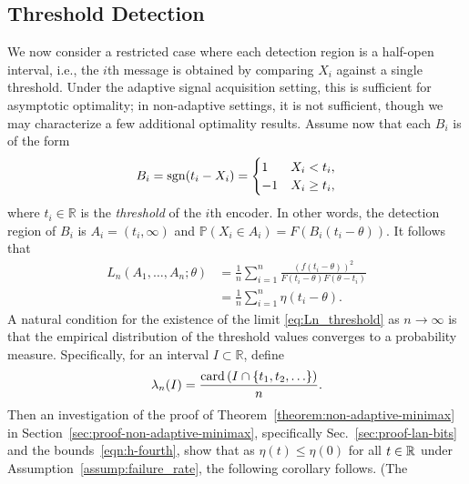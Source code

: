 \subsection{Threshold Detection}
\label{subsec:threshold}

We now consider a restricted case where each detection region is a
half-open interval, i.e., the $i$th message is obtained by comparing $X_i$
against a single threshold. Under the adaptive signal acquisition setting,
this is sufficient for asymptotic optimality;
in non-adaptive settings, it is not sufficient, though we may characterize
a few additional optimality results.
Assume now that each $B_i$ is of the form
\begin{equation}
  \label{eq:threshold_message}
  B_i = \mathrm{sgn}(t_i - X_i) = \begin{cases} 1 & X_i<  t_i, \\
    -1 & X_i \geq t_i,
  \end{cases}  
\end{equation}
where $t_i\in\mathbb R$ is the \emph{threshold} of the $i$th encoder. In
other words, the detection region of $B_i$ is $A_i = (t_i,\infty)$ and
$\mathbb P(X_i \in A_i) = F \left( B_i(t_i-\theta) \right)$. It follows that
\begin{align}
  L_n(A_1,\ldots,A_n;\theta)
  & = \frac{1}{n} \sum_{i=1}^n \frac{ \left(f(t_i-\theta) \right)^2 }{F\left(t_i-\theta \right) F\left(\theta - t_i \right) } \\
  & = \frac{1}{n} \sum_{i=1}^n \eta(t_i - \theta).
  \label{eq:Ln_threshold}
\end{align}
A natural condition for the existence of the limit \eqref{eq:Ln_threshold}
as $n\to \infty$ is that the empirical distribution of the threshold values
converges to a probability measure. Specifically, for an interval $I \subset
\mathbb R$, define
\begin{equation*}
  \lambda_n(I) = \frac{ \mathrm{card} \left( I \cap \{t_1,t_2,\ldots \} \right)}{n}. 
\end{equation*}
Then an investigation of the proof of
Theorem~\ref{theorem:non-adaptive-minimax} in
Section~\ref{sec:proof-non-adaptive-minimax}, specifically
Sec.~\ref{sec:proof-lan-bits} and the bounds~\eqref{eqn:h-fourth}, show that
as $\eta(t) \le \eta(0)$ for all $t \in \mathbb{R}$ under
Assumption~\ref{assump:failure_rate}, the following corollary follows. (The
